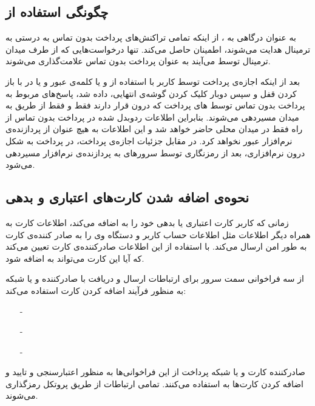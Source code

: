 \documentclass[oneside]{report}
\begin{document}
  
   \subsection{چگونگی استفاده {\small {}}  از {\small {}} }                                 
   به عنوان درگاهی به 
   {\normalsize {}}
   ،  {\normalsize {}}
   از اینکه تمامی تراکنش‌های پرداخت بدون تماس به درستی به ترمینال 
   {\normalsize {}}
   هدایت می‌شوند، اطمینان حاصل می‌کند.
   تنها درخواست‌هایی که از طرف میدان ترمینال توسط 
   {\normalsize {}}
   	می‌آیند به عنوان پرداخت بدون تماس علامت‌گذاری می‌شوند.
   	
   	بعد از اینکه اجازه‌ی پرداخت توسط کاربر با استفاده از 
   	{\normalsize {}}
   	و یا کلمه‌ی عبور 
   	و یا در 
   	{\normalsize {}} با باز کردن قفل و سپس دوبار کلیک کردن گوشه‌ی انتهایی،  داده شد، پاسخ‌های مربوط به پرداخت بدون تماس توسط 
   	{\normalsize {}} های پرداخت 
   	که درون 
   	{\normalsize {}}
   	قرار دارند فقط و فقط از طریق 
   	{\normalsize {}}
   	به میدان 
   	{\normalsize {}}
   	مسیردهی می‌شوند. بنابراین اطلاعات ردوبدل شده در پرداخت بدون تماس از راه 
   	   	{\normalsize {}}
   	   	فقط در میدان 
   	   	   	{\normalsize {}}
   	  محلی حاضر خواهد شد و این اطلاعات به هیچ عنوان از پردازنده‌ی نرم‌افزار عبور نخواهد کرد.
   	  در مقابل جزئیات اجازه‌ی پرداخت،  در پرداخت به شکل درون نرم‌افزاری،  بعد از رمزنگاری توسط سرورهای 
   	     	{\normalsize {}}
   	   به پردازنده‌ی نرم‌افزار مسیردهی می‌شود.
   	   
   \subsection{نحوه‌ی اضافه شدن کارت‌های اعتباری و بدهی}
   	زمانی که کاربر کارت اعتباری یا بدهی خود را به 
   	   	   	   	{\normalsize {}}
   	 اضافه می‌کند،
   	    	   	   	{\normalsize {}} 
   	 اطلاعات کارت به همراه دیگر اطلاعات مثل اطلاعات حساب کاربر و دستگاه وی را به صادر کننده‌ی کارت به طور امن ارسال می‌کند. با استفاده از این اطلاعات صادرکننده‌ی کارت تعیین می‌کند که آیا این کارت می‌تواند به 
   	    	   	   	{\normalsize {}}
   	    	   	   اضافه شود.
   	    	   	   
   	{\normalsize {}} 
   	از سه فراخوانی سمت سرور برای ارتباطات ارسال و دریافت با صادرکننده‌ و یا شبکه به منظور فرآیند اضافه کردن کارت استفاده می‌کند:
   	\begin{itemize}
   		\item[-]    	{\normalsize {}}
   		\item[-] 	   	{\normalsize {}}
   		\item[-]	   	{\normalsize {}}  
   	\end{itemize}
   	      صادرکننده کارت و یا شبکه پرداخت از این فراخوانی‌ها به منظور اعتبارسنجی و تایید و اضافه کردن کارت‌ها به 
   	         	{\normalsize {}} 
   	         	استفاده می‌کنند.
  تمامی ارتباطات 
     	{\normalsize {}} 
     	از طریق پروتکل 
     	   	{\normalsize {}} 
     	   	رمزگذاری می‌شوند.       					       
     	   	
\end{document}
